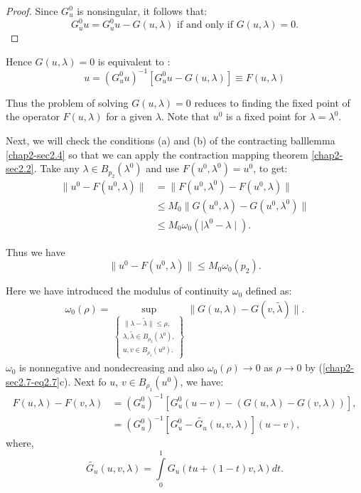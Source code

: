 \begin{proof}
Since $G^0_u$ is nonsingular, it follows that: 
$$
G^0_u u = G^0_u u - G(u, \lambda)  \text{ \ if and only if \ } 
G(u,\lambda) = 0. 
$$
\end{proof}

Hence $G(u,\lambda) = 0$ is equivalent to :
\begin{equation*}
u = (G^0_uu)^{-1} [G^0_u u - G(u, \lambda)] \equiv F(u, \lambda)
\tag{2.8}\label{chap2-sec2.7-eq2.8}     
\end{equation*}

Thus the problem of solving $G(u, \lambda) = 0$ reduces to finding the
fixed point of the operator $F(u, \lambda)$ for a given $\lambda$.
Note that $u^0$ is a fixed point for $\lambda = \lambda^0$. 

Next, we will check the conditions (a) and (b) of the contracting
ball\pageoriginale lemma \eqref{chap2-sec2.4} so that we can apply the
contraction mapping 
theorem \eqref{chap2-sec2.2}. Take any $\lambda \in
B_{p_2}(\lambda^0)$ and use 
$F(u^0, \lambda^0) = u^0$, to get: 
\begin{align*}
\| u^0 - F(u^0, \lambda) \| & =\|F(u^0, \lambda^0) - F(u^0, \lambda) \| \\
& \le M_0 \| G(u^0, \lambda) - G(u^0, \lambda^0) \| \\
& \le M_0 \omega_0 (\mid \lambda^0 - \lambda \mid ).
\end{align*}

Thus we have
\begin{equation*}
\| u^0 - F(u^0, \lambda) \| \le M_0 \omega_0
(p_2). \tag{2.9}\label{chap2-sec2.7-eq2.9}      
\end{equation*}

Here we have introduced the modulus of continuity $\omega_0$ defined
as: 
\begin{gather*}
\omega_0 (\rho) = \sup_{\left \{ 
\begin{matrix}
\| \lambda - \tilde{\lambda} \| \le \rho ,\\
\lambda,\tilde{\lambda} \in B_{\rho_2} (\lambda^0) ,\\
u, v \in B_{\rho_1} (u^0). 
\end{matrix}
\right \}} \| G(u,\lambda) - G(v, \tilde{\lambda}) \|. \tag{2.10} 
\label{chap2-sec2.7-eq2.10}    
\end{gather*}
$\omega_0$ is nonnegative and nondecreasing and also $\omega_0 (\rho)
\rightarrow 0 $ as $\rho \rightarrow 0$ by
(\ref{chap2-sec2.7-eq2.7}c). Next fo $u$, $v \in B_{\rho_1} (u^0)$, we have: 
\begin{align*}
F(u, \lambda) -F(v, \lambda) &= (G^0_u)^{-1} [G^0_u (u-v) - (G(u,
  \lambda) - G(v, \lambda))], \\ 
&  = (G^0_u)^{-1} [G^0_u - \tilde{G_u} (u, v, \lambda)] (u-v),
\tag{2.11a} \label{chap2-sec2.7-eq2.11a}    
\end{align*}    
where,
$$ 
\tilde{G_u} (u, v, \lambda) = \int\limits^1_0 G_u (tu + (1-t) v,
\lambda) dt.  
$$

